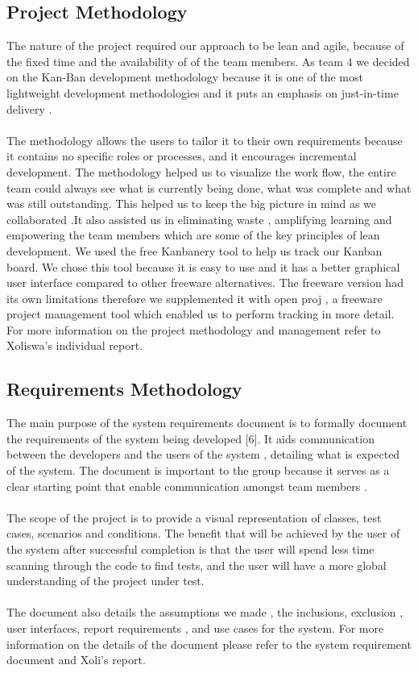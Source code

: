 \documentclass[a4paper,12pt]{Article}
\begin{document}
\subsection{Project Methodology }
The nature of the project required our approach to be lean and agile, because of the fixed time and the availability of of the team members. As team 4 we decided on the Kan-Ban development methodology  because it is one of the most lightweight development methodologies  and it puts an emphasis on just-in-time  delivery .
\\\\The methodology allows the users to tailor it to their own requirements  because it contains no specific roles or processes, and it encourages incremental development. The methodology helped us to visualize the work flow, the entire team could always see what is currently being done, what was complete and what was still outstanding. This helped us to keep the big picture in mind as we collaborated .It also assisted us in eliminating waste , amplifying learning and empowering the team members which are some of the key principles of lean development.
We used the free Kanbanery tool to help us track our Kanban board. We chose this tool because it is easy to use and it has a better  graphical user interface compared to other freeware alternatives. The freeware version had its own limitations therefore we supplemented it with open proj , a freeware project management tool which enabled us to perform tracking  in more detail. For more information on the project methodology and management refer to Xoliswa’s individual report.
\subsection{Requirements Methodology}
The main purpose of the system requirements document is to formally document the requirements of the system being developed [6]. It aids communication between the developers and the users of the system , detailing  what is expected of the system. The document is important to the group because it serves as a clear starting point that enable communication amongst team members .
\\\\The scope of the project is to provide a visual representation of classes, test cases, scenarios and conditions. The benefit that will be achieved by the user of the system after successful completion is that the user will spend less time scanning through the code to find tests, and the user will have a more global understanding of the project under test.
\\\\The document also details the assumptions we made , the inclusions, exclusion , user interfaces, report requirements , and use cases for the system. For more information on the details of the document  please refer to the system requirement document and Xoli’s report.
\end{document}
